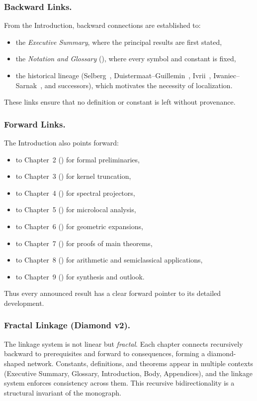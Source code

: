 \subsubsection*{Backward Links.}
From the Introduction, backward connections are established to:
\begin{itemize}
  \item the \emph{Executive Summary}, where the principal results are first stated,
  \item the \emph{Notation and Glossary} (),
        where every symbol and constant is fixed,
  \item the historical lineage (Selberg~\cite{Selberg1956},
        Duistermaat–Guillemin~\cite{DG1975}, Ivrii~\cite{Ivrii1980},
        Iwaniec–Sarnak~\cite{Iwaniec2002}, and successors),
        which motivates the necessity of localization.
\end{itemize}
These links ensure that no definition or constant is left without provenance.

\subsubsection*{Forward Links.}
The Introduction also points forward:
\begin{itemize}
  \item to Chapter~2 () for formal preliminaries,
  \item to Chapter~3 () for kernel truncation,
  \item to Chapter~4 () for spectral projectors,
  \item to Chapter~5 () for microlocal analysis,
  \item to Chapter~6 () for geometric expansions,
  \item to Chapter~7 () for proofs of main theorems,
  \item to Chapter~8 () for arithmetic and semiclassical applications,
  \item to Chapter~9 () for synthesis and outlook.
\end{itemize}
Thus every announced result has a clear forward pointer to its detailed development.

\subsubsection*{Fractal Linkage (Diamond v2).}
The linkage system is not linear but \emph{fractal}.
Each chapter connects recursively backward to prerequisites
and forward to consequences, forming a diamond-shaped network.
Constants, definitions, and theorems appear in multiple contexts
(Executive Summary, Glossary, Introduction, Body, Appendices),
and the linkage system enforces consistency across them.
This recursive bidirectionality is a structural invariant of the monograph.

